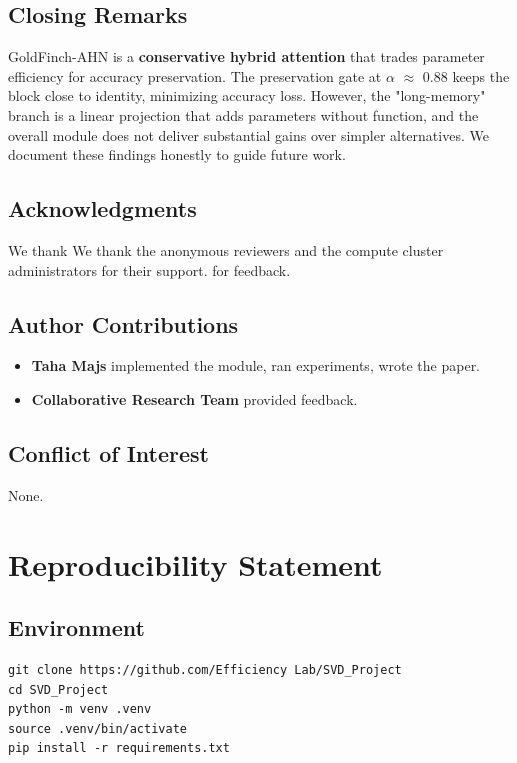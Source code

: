 \subsection{Closing Remarks}

GoldFinch-AHN is a \textbf{conservative hybrid attention} that trades parameter 
efficiency for accuracy preservation. The preservation gate at $\alpha$ $\approx$ 0.88 
keeps the block close to identity, minimizing accuracy loss. However, the 
"long-memory" branch is a linear projection that adds parameters without 
function, and the overall module does not deliver substantial gains over 
simpler alternatives. We document these findings honestly to guide future 
work.

\subsection{Acknowledgments}

We thank We thank the anonymous reviewers and the compute cluster administrators for their support. for feedback.

\subsection{Author Contributions}

\begin{itemize}
\item \textbf{Taha Majs} implemented the module, ran experiments, wrote the paper.
\item \textbf{Collaborative Research Team} provided feedback.

\end{itemize}
\subsection{Conflict of Interest}

None.




\section{Reproducibility Statement}

\subsection{Environment}

\begin{lstlisting}
git clone https://github.com/Efficiency Lab/SVD_Project
cd SVD_Project
python -m venv .venv
source .venv/bin/activate
pip install -r requirements.txt
\end{lstlisting}

